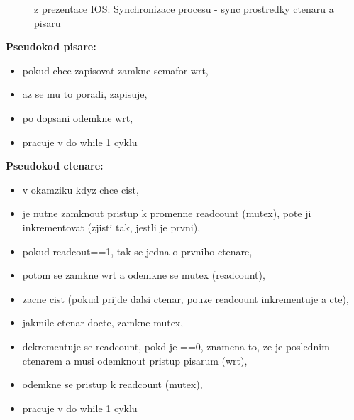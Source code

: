 \documentclass[a4paper, 11pt]{article}
\begin{document}
\begin{figure} [ht]
    \centering
    \caption{z prezentace IOS: Synchronizace procesu - sync prostredky ctenaru a pisaru}
\end{figure}

\textbf{Pseudokod pisare:}
\begin{itemize}
    \item pokud chce zapisovat zamkne semafor wrt,
    \item az se mu to poradi, zapisuje,
    \item po dopsani odemkne wrt,
    \item pracuje v do while 1 cyklu \\
\end{itemize}

\textbf{Pseudokod ctenare:}
\begin{itemize}
    \item v okamziku kdyz chce cist,
    \item je nutne zamknout pristup k promenne readcount (mutex), pote ji inkrementovat (zjisti tak, jestli je prvni),
    \item pokud readcout==1, tak se jedna o prvniho ctenare,
    \item potom se zamkne wrt a odemkne se mutex (readcount),
    \item zacne cist (pokud prijde dalsi ctenar, pouze readcount inkrementuje a cte),
    \item jakmile ctenar docte, zamkne mutex,
    \item dekrementuje se readcount, pokd je ==0, znamena to, ze je poslednim ctenarem a musi odemknout pristup pisarum (wrt),
    \item odemkne se pristup k readcount (mutex),
    \item pracuje v do while 1 cyklu \\
\end{itemize}
\end{document}
